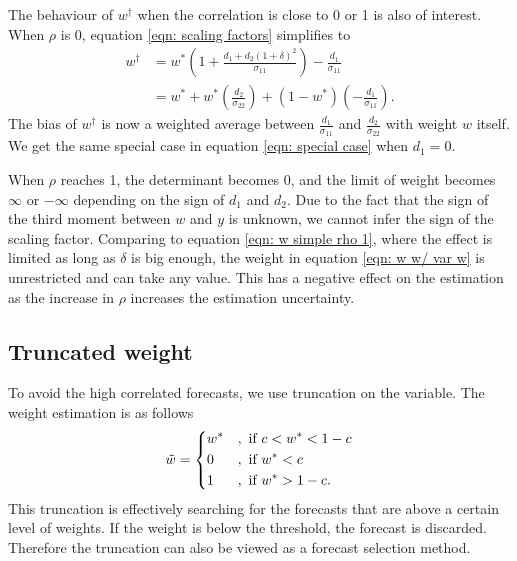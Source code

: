 \documentclass[11pt]{article}
\begin{document}
The behaviour of $w^\dagger$ when the correlation is close to 0 or 1 is also of interest. When $\rho$ is 0, equation \ref{eqn: scaling factors} simplifies to 
\begin{equation}
\label{eqn: scaling factor rho 0}
\begin{aligned}
w^\dagger &= w^*(1+\frac{d_1 + d_2 (1+\delta)^2} {\sigma_{11} }) - \frac{d_1}{\sigma_{11}}\\
&=w^* +w^*(\frac{d_2}{\sigma_{22} }) + (1-w^*)(-\frac{d_1}{\sigma_{11}}).
\end{aligned}
\end{equation}
The bias of $w^\dagger$ is now a weighted average between $\frac{d_1}{\sigma_{11}}$ and $\frac{d_2}{\sigma_{22}}$ with weight $w$ itself. We get the same special case in equation \ref{eqn: special case} when $d_1=0$.

When $\rho$ reaches 1, the determinant becomes 0, and the limit of weight becomes $\infty$ or $-\infty$ depending on the sign of $d_1$ and $d_2$. Due to the fact that the sign of the third moment between $w$ and $y$ is unknown, we cannot infer the sign of the scaling factor. Comparing to equation \ref{eqn: w simple rho 1}, where the effect is limited as long as $\delta$ is big enough, the weight in equation \ref{eqn: w w/ var w} is unrestricted and can take any value. This has a negative effect on the estimation as the increase in $\rho$ increases the estimation uncertainty.

\subsection{Truncated weight}\label{truncated-weight}

To avoid the high correlated forecasts, we use truncation on the
variable. The weight estimation is as follows
\begin{equation}
\label{eqn: w trunc}
\tilde{w} = 
\begin{dcases}
w^* &, \text{ if } c<w^*<1-c \\
0 &, \text{ if } w^*<c \\
1 &, \text{ if } w^*>1-c.
\end{dcases}
\end{equation}
This truncation is effectively searching for the forecasts that are above a certain level of weights. If the weight is below the threshold, the forecast is discarded. Therefore the truncation can also be viewed as a forecast selection method.
\end{document}
